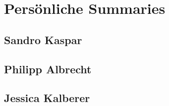 \section{Persönliche Summaries}
\subsection{Sandro Kaspar}

\subsection{Philipp Albrecht}

\subsection{Jessica Kalberer}
